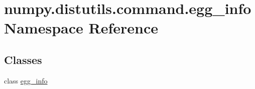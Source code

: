 \hypertarget{namespacenumpy_1_1distutils_1_1command_1_1egg__info}{}\section{numpy.\+distutils.\+command.\+egg\+\_\+info Namespace Reference}
\label{namespacenumpy_1_1distutils_1_1command_1_1egg__info}
\subsection*{Classes}
\begin{DoxyCompactItemize}
\item 
class \hyperlink{classnumpy_1_1distutils_1_1command_1_1egg__info_1_1egg__info}{egg\+\_\+info}
\end{DoxyCompactItemize}
